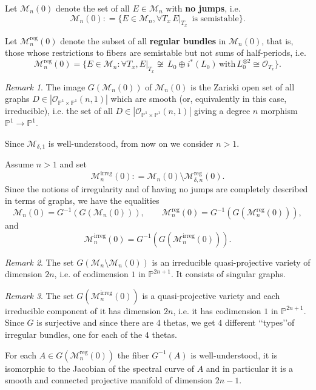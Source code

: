 \documentclass[
  a4paper, 
  reqno, 
  oneside, 
  11pt
]{amsart}
\theoremstyle{plain}	%
\theoremstyle{mydef} %
\theoremstyle{remark}
\newtheorem{remark}{Remark}
\theoremstyle{definition}
\theoremstyle{remark}
\DeclareMathOperator{\reg}{reg}
\DeclareMathOperator{\irreg}{irreg}
\newcommand{\ce}{\mathrel{\mathop:}=}
\begin{document}
Let  $\mathcal M_n(0)$ denote the set of all $E\in  \mathcal M_n$ with {\bf no jumps}, i.e.
$$\mathcal M_n(0) \ce  \{E\in  \mathcal M_n,  \forall T_x \, E\vert_{T_x}\, \text{ is semistable}\}.$$

 Let  $\mathcal M_n^{\reg}(0)$ denote the subset of all {\bf regular bundles} in $\mathcal M_n(0)$, that is, 
 those whose restrictions to fibers are semistable but not sums of  half-periods, i.e.
 $$\mathcal M_n^{\reg}(0)= \{E\in  \mathcal M_n: \forall   T_x, 
  E\vert_{T_x}   \not\cong  \, L_0\oplus i^\ast(L_0) \, \text{with}\, L_0^{\otimes 2} \cong \mathcal O_{T_x} \}.$$


\begin{remark}The image $G(\mathcal M_n(0))$ of $\mathcal M_n(0)$ is the Zariski open set of all graphs $D\in |\mathcal O_{\mathbb P^1\times \mathbb P^1}(n,1)|$ which are smooth (or, equivalently in this case, irreducible), i.e. the set of all $D\in |\mathcal O_{\mathbb P^1\times \mathbb P^1}(n,1)|$ 
giving a degree $n$ morphism $\mathbb P^1\to \mathbb P^1$.
\end{remark}

Since $\mathcal M_{\delta,1}$ is well-understood, from now on we consider $n>1$.


Assume $n>1$ and set $$\mathcal M_n^{\irreg}(0)\ce \mathcal M_n(0)\setminus \mathcal M^{\reg}_{\delta,n}(0).$$ 
Since the notions of irregularity and of having no jumps are completely 
 described in terms of graphs, we have the equalities
$$ \mathcal M_n(0) =G^{-1}(G(\mathcal M_n(0))), \quad \quad 
 \mathcal M_n^{\reg}(0) =G^{-1}(G(\mathcal M_n^{\reg}(0))),  $$and
$$ \mathcal M_n^{\irreg}(0) =G^{-1}(G(\mathcal M_n^{\irreg}(0))).$$

\begin{remark}\label{rr1}
The set $G(\mathcal M_n\setminus \mathcal M_n(0))$ is an irreducible quasi-projective variety of dimension $2n$, i.e. of codimension $1$ in $\mathbb P^{2n+1}$. It consists of singular graphs.
\end{remark}

\begin{remark}
 The set $G(\mathcal M_n^{\irreg}(0))$ is a quasi-projective variety  and each irreducible component of it has dimension $2n$, i.e. it has codimension $1$ in $\mathbb P^{2n+1}$. Since $G$ is surjective and since there are $4$ thetas, we get $4$ different \lq\lq types\rq\rq of irregular bundles, one for each of the $4$ thetas.
\end{remark}

For each $A\in G(\mathcal M_n^{\reg}(0))$ the fiber $G^{-1}(A)$ is well-understood, it is isomorphic to the Jacobian of the spectral curve of $A$ and in particular
it is a smooth and connected projective manifold of dimension $2n-1$.  
\end{document}
